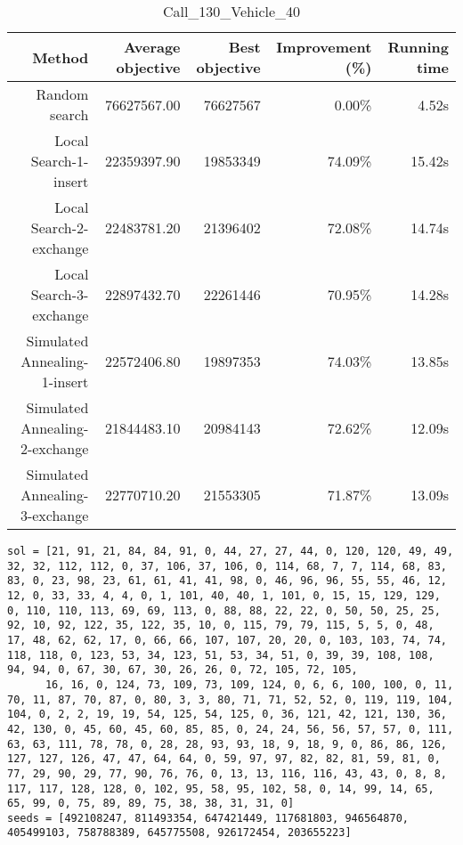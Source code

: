 \begin{table}[ht]
\centering
\caption{Call\_130\_Vehicle\_40}
\label{tab:call130vehicle40}
\begin{tabular}{|r|r|r|r|r|}
Method & Average objective & Best objective & Improvement (\%) & Running time \\
\hline
Random search & 76627567.00 & 76627567 & 0.00\% & 4.52s\\
Local Search-1-insert & 22359397.90 & 19853349 & 74.09\% & 15.42s\\
Local Search-2-exchange & 22483781.20 & 21396402 & 72.08\% & 14.74s\\
Local Search-3-exchange & 22897432.70 & 22261446 & 70.95\% & 14.28s\\
Simulated Annealing-1-insert & 22572406.80 & 19897353 & 74.03\% & 13.85s\\
Simulated Annealing-2-exchange & 21844483.10 & 20984143 & 72.62\% & 12.09s\\
Simulated Annealing-3-exchange & 22770710.20 & 21553305 & 71.87\% & 13.09s\\
\end{tabular}%
\end{table}
\begin{lstlisting}[label={lst:call130vehicle40},caption=Optimal solution call\_130\_vehicle\_40]
sol = [21, 91, 21, 84, 84, 91, 0, 44, 27, 27, 44, 0, 120, 120, 49, 49, 32, 32, 112, 112, 0, 37, 106, 37, 106, 0, 114, 68, 7, 7, 114, 68, 83, 83, 0, 23, 98, 23, 61, 61, 41, 41, 98, 0, 46, 96, 96, 55, 55, 46, 12, 12, 0, 33, 33, 4, 4, 0, 1, 101, 40, 40, 1, 101, 0, 15, 15, 129, 129, 0, 110, 110, 113, 69, 69, 113, 0, 88, 88, 22, 22, 0, 50, 50, 25, 25, 92, 10, 92, 122, 35, 122, 35, 10, 0, 115, 79, 79, 115, 5, 5, 0, 48, 17, 48, 62, 62, 17, 0, 66, 66, 107, 107, 20, 20, 0, 103, 103, 74, 74, 118, 118, 0, 123, 53, 34, 123, 51, 53, 34, 51, 0, 39, 39, 108, 108, 94, 94, 0, 67, 30, 67, 30, 26, 26, 0, 72, 105, 72, 105,
      16, 16, 0, 124, 73, 109, 73, 109, 124, 0, 6, 6, 100, 100, 0, 11, 70, 11, 87, 70, 87, 0, 80, 3, 3, 80, 71, 71, 52, 52, 0, 119, 119, 104, 104, 0, 2, 2, 19, 19, 54, 125, 54, 125, 0, 36, 121, 42, 121, 130, 36, 42, 130, 0, 45, 60, 45, 60, 85, 85, 0, 24, 24, 56, 56, 57, 57, 0, 111, 63, 63, 111, 78, 78, 0, 28, 28, 93, 93, 18, 9, 18, 9, 0, 86, 86, 126, 127, 127, 126, 47, 47, 64, 64, 0, 59, 97, 97, 82, 82, 81, 59, 81, 0, 77, 29, 90, 29, 77, 90, 76, 76, 0, 13, 13, 116, 116, 43, 43, 0, 8, 8, 117, 117, 128, 128, 0, 102, 95, 58, 95, 102, 58, 0, 14, 99, 14, 65, 65, 99, 0, 75, 89, 89, 75, 38, 38, 31, 31, 0]
seeds = [492108247, 811493354, 647421449, 117681803, 946564870, 405499103, 758788389, 645775508, 926172454, 203655223]
\end{lstlisting}%
\clearpage


